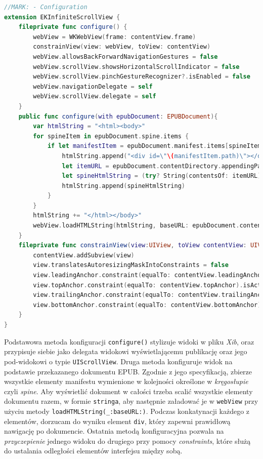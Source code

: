\begin{lstlisting}[language=swift,caption={Rozszerzenie klasy \texttt{EKInfiniteScrollView} o metody konfiguracji}, label=EKInfiniteScrollView-extension-1]
//MARK: - Configuration
extension EKInfiniteScrollView {
    fileprivate func configure() {
        webView = WKWebView(frame: contentView.frame)
        constrainView(view: webView, toView: contentView)
        webView.allowsBackForwardNavigationGestures = false
        webView.scrollView.showsHorizontalScrollIndicator = false
        webView.scrollView.pinchGestureRecognizer?.isEnabled = false
        webView.navigationDelegate = self
        webView.scrollView.delegate = self
    }
    public func configure(with epubDocument: EPUBDocument){
        var htmlString = "<html><body>"
        for spineItem in epubDocument.spine.items {
            if let manifestItem = epubDocument.manifest.items[spineItem.idref] {
                htmlString.append("<div id=\"\(manifestItem.path)\"></div>")
                let itemURL = epubDocument.contentDirectory.appendingPathComponent(manifestItem.path)
                let spineHtmlString = (try? String(contentsOf: itemURL)) ?? ""
                htmlString.append(spineHtmlString)
            }
        }
        htmlString += "</html></body>"
        webView.loadHTMLString(htmlString, baseURL: epubDocument.contentDirectory)
    }
    fileprivate func constrainView(view:UIView, toView contentView: UIView) {
        contentView.addSubview(view)
        view.translatesAutoresizingMaskIntoConstraints = false
        view.leadingAnchor.constraint(equalTo: contentView.leadingAnchor).isActive = true
        view.topAnchor.constraint(equalTo: contentView.topAnchor).isActive = true
        view.trailingAnchor.constraint(equalTo: contentView.trailingAnchor).isActive = true
        view.bottomAnchor.constraint(equalTo: contentView.bottomAnchor).isActive = true
    }
}
\end{lstlisting}

Podstawowa metoda konfiguracji \texttt{configure()} stylizuje widoki w pliku \textit{Xib}, oraz przypisuje siebie jako delegata widokowi wyświetlającemu publikację oraz jego pod-widokowi o typie \texttt{UIScrollView}. Druga metoda konfiguruje widok na podstawie przekazanego dokumentu EPUB. Zgodnie z jego specyfikacją, zbierze wszystkie elementy manifestu wymienione w kolejności określone w \textit{kręgosłupie} czyli \textit{spine}. Aby wyświetlić dokument w całości trzeba scalić wszystkie elementy dokumentu razem, w formie \texttt{stringa}, aby następnie załadować je w \texttt{webView} przy użyciu metody \texttt{loadHTMLString(\_:baseURL:)}. Podczas konkatynacji każdego z elementów, dorzucam do wyniku element \texttt{div}, który zapewni prawidłową nawigację po dokumencie. Ostatnia metodą konfiguracyjna pozwala na \textit{przyczepienie} jednego widoku do drugiego przy pomocy \textit{constraints}, które służą do ustalania odległości elementów interfejsu między sobą.


